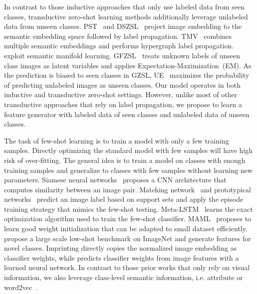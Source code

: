 \documentclass[10pt,twocolumn,letterpaper]{article}
\newcommand{\myparagraph}[1]{\vspace{5pt}\noindent{\bf #1}}
\begin{document}
In contrast to those inductive approaches that only use labeled data from seen classes, transductive zero-shot learning methods additionally leverage unlabeled data from unseen classes. PST~\cite{MES13} and DSZSL~\cite{ye2017zero} project image embedding to the semantic embedding space followed by label propagation. TMV~\cite{FHXFG15} combines multiple semantic embeddings and performs hypergraph label propagation. 
\cite{KXFG15, fu2016semi} exploit semantic manifold learning. GFZSL~\cite{verma2017simple} treats unknown labels of unseen class images as latent variables and applies Expectation-Maximization~(EM). As the prediction is biased to seen classes in GZSL, UE~\cite{song2018transductive} maximizes the probability of predicting unlabeled images as unseen classes. Our model operates in both inductive and transductive zero-shot settings. However, unlike most of other transductive approaches that rely on label propagation, we propose to learn a feature generator with labeled data of seen classes and unlabeled data of unseen classes. 

\myparagraph{Few-shot Learning.} The task of few-shot learning is to train a model with only a few training samples. Directly optimizing the standard model with few samples will have high risk of over-fitting. The general idea is to train a model on classes with enough training samples and generalize to classes with few samples without learning new parameters. Siamese neural networks~\cite{koch2015siamese} proposes a CNN architecture that computes similarity between an image pair. Matching network~\cite{vinyals2016matching} and prototypical networks~\cite{snell2017prototypical} predict an image label based on support sets and apply the episode training strategy that mimics the few-shot testing. 
Meta-LSTM~\cite{ravi2016optimization} learns the exact optimization algorithm used to train the few-shot classifier. MAML~\cite{finn2017model} proposes to learn good weight initialization that can be adapted to small dataset efficiently. \cite{HG16,wang2018low} propose a large scale low-shot benchmark on ImageNet and generate features for novel classes.
Imprinting\cite{qi2018low} directly copies the normalized image embedding as classifier weights, while \cite{qiao2018few} predicts classifier weights from image features with a learned neural network. In contrast to those prior works that only rely on visual information, we also leverage class-level semantic information, i.e. attribute or word2vec~\cite{MSCCD13}. 
\end{document}

